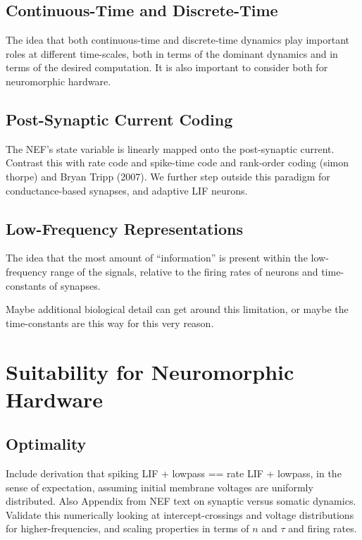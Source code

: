 \subsection{Continuous-Time and Discrete-Time}

The idea that both continuous-time and discrete-time dynamics play important roles at different time-scales, both in terms of the dominant dynamics and in terms of the desired computation.
It is also important to consider both for neuromorphic hardware.

\subsection{Post-Synaptic Current Coding}

The NEF's state variable is linearly mapped onto the post-synaptic current.
Contrast this with rate code and spike-time code and rank-order coding (simon thorpe) and Bryan Tripp (2007).
We further step outside this paradigm for conductance-based synapses, and adaptive LIF neurons.

\subsection{Low-Frequency Representations}

The idea that the most amount of ``information'' is present within the low-frequency range of the signals, relative to the firing rates of neurons and time-constants of synapses.

Maybe additional biological detail can get around this limitation, or maybe the time-constants are this way for this very reason.


\section{Suitability for Neuromorphic Hardware}


\subsection{Optimality}

Include derivation that spiking LIF + lowpass == rate LIF + lowpass, in the sense of expectation, assuming initial membrane voltages are uniformly distributed.
Also Appendix from NEF text on synaptic versus somatic dynamics.
Validate this numerically looking at intercept-crossings and voltage distributions for higher-frequencies, and scaling properties in terms of $n$ and $\tau$ and firing rates.

